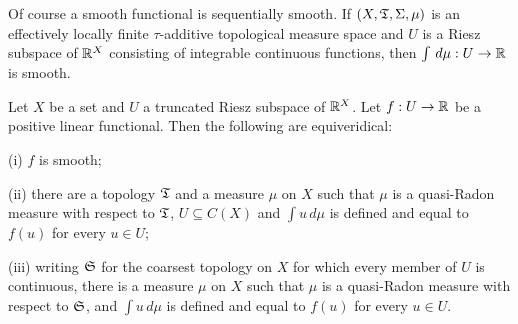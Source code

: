 Of course a smooth functional is sequentially smooth.   If 
$(X,\frak T,\Sigma,\mu)$ is an effectively locally finite 
$\tau$-additive 
topological measure space and $U$ is a Riesz subspace of $\Bbb R^X$ 
consisting of integrable continuous functions, then 
$\int\,d\mu:U\to\Bbb R$ is 
smooth.    
      
 Let $X$ be a set and $U$ a truncated Riesz 
subspace of $\Bbb R^X$.   Let $f:U\to\Bbb R$ be a positive linear 
functional.   Then the following are equiveridical: 
      
(i) $f$ is smooth; 
      
(ii) there are a topology $\frak T$ and a measure $\mu$ on $X$ such that 
$\mu$ is a quasi-Radon measure with respect to $\frak T$, 
$U\subseteq C(X)$ and $\int u\,d\mu$ is defined and equal to $f(u)$ for 
every $u\in U$; 
      
(iii) writing $\frak S$ for the coarsest topology on $X$ for which every 
member of $U$ is continuous, there is a 
measure $\mu$ on $X$ such that $\mu$ is a quasi-Radon measure with 
respect to $\frak S$, 
and $\int u\,d\mu$ is defined and equal to $f(u)$ for every $u\in U$. 
      
